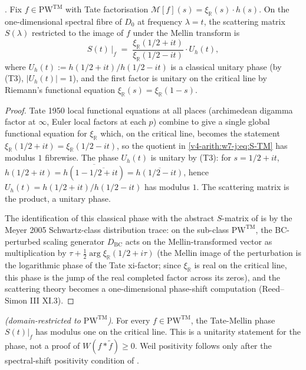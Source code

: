 \begin{proposition}
\label{v4-arith:w7-j:prop:TM-S-classical}
\ClaimStatusProvedHereConditional. Fix \(f\in\mathrm{PW}^{\mathrm{TM}}\) with
Tate factorisation
\(\mathcal{M}[f](s)=\xi_{\mathbb{R}}(s)\cdot h(s)\). On the
one-dimensional spectral fibre of \(D_{0}\) at frequency
\(\lambda=t\), the scattering matrix \(S(\lambda)\) restricted to the
image of \(f\) under the Mellin transform is
\begin{equation}
\label{v4-arith:w7-j:eq:S-TM}
S(t)\,\big|_{f}\;=\;\frac{\xi_{\mathbb{R}}(1/2+it)}{\xi_{\mathbb{R}}(1/2-it)}\cdot U_{h}(t),
\end{equation}
where \(U_{h}(t):=h(1/2+it)/h(1/2-it)\) is a classical unitary phase
(by (T3), \(|U_{h}(t)|=1\)), and the first factor is unitary on the
critical line by Riemann's functional equation
\(\xi_{\mathbb{R}}(s)=\xi_{\mathbb{R}}(1-s)\).
\end{proposition}

\begin{proof}
Tate 1950 local functional equations at all places (archimedean
digamma factor at \(\infty\), Euler local factors at each \(p\)) combine
to give a single global functional equation for \(\xi_{\mathbb{R}}\)
which, on the critical line, becomes the statement
\(\xi_{\mathbb{R}}(1/2+it)=\xi_{\mathbb{R}}(1/2-it)\), so the quotient
in \eqref{v4-arith:w7-j:eq:S-TM} has modulus \(1\) fibrewise. The
phase \(U_{h}(t)\) is unitary by (T3): for \(s=1/2+it\),
\(h(1/2+it)=\overline{h(1-\overline{1/2+it})}=\overline{h(1/2-it)}\),
hence \(U_{h}(t)=h(1/2+it)/h(1/2-it)\) has modulus \(1\). The scattering
matrix is the product, a unitary phase.

The identification of this classical phase with the abstract
\(S\)-matrix of  is by the
Meyer 2005 Schwartz-class distribution trace: on the sub-class
\(\mathrm{PW}^{\mathrm{TM}}\), the BC-perturbed scaling generator
\(D_{\mathrm{BC}}\) acts on the Mellin-transformed vector as
multiplication by \(\tau + \tfrac{1}{2}\arg\xi_{\mathbb{R}}(1/2+i\tau)\)
(the Mellin image of the perturbation is the logarithmic phase of
the Tate xi-factor; since \(\xi_{\mathbb{R}}\) is real on the critical
line, this phase is the jump of the real completed factor across its
zeros),
and the scattering theory becomes a one-dimensional phase-shift
computation (Reed--Simon III XI.3).
\end{proof}

\begin{theorem}
\label{v4-arith:w7-j:thm:ATP-TM-closure}
\ClaimStatusProvedHereConditional \emph{(domain-restricted to
\(\mathrm{PW}^{\mathrm{TM}}\))}. For every
\(f\in\mathrm{PW}^{\mathrm{TM}}\), the Tate-Mellin phase
\(S(t)|_{f}\) has modulus one on the critical line. This is a
unitarity statement for the phase, not a proof of
\(W(f*\widetilde{f})\geq0\). Weil positivity follows only after the
spectral-shift positivity condition of
.
\end{theorem}


